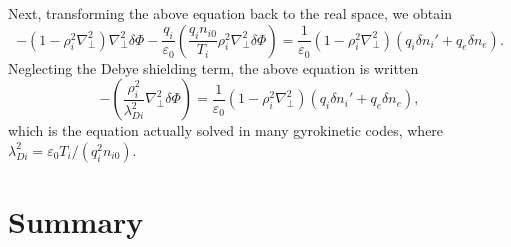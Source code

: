 \documentclass{article}
\begin{document}
Next, transforming the above equation back to the real space, we obtain
\begin{equation}
  - (1 - \rho_i^2 \nabla_{\perp}^2) \nabla_{\perp}^2 \delta \Phi -
  \frac{q_i}{\varepsilon_0} \left( \frac{q_i n_{i 0}}{T_i} \rho_i^2
  \nabla_{\perp}^2 \delta \Phi \right) = \frac{1}{\varepsilon_0} (1 - \rho_i^2
  \nabla_{\perp}^2) (q_i \delta n_i' + q_e \delta n_e) .
\end{equation}
Neglecting the Debye shielding term, the above equation is written
\begin{equation}
  - \left( \frac{\rho_i^2}{\lambda_{D i}^2} \nabla_{\perp}^2 \delta \Phi
  \right) = \frac{1}{\varepsilon_0} (1 - \rho_i^2 \nabla_{\perp}^2) (q_i
  \delta n_i' + q_e \delta n_e),
\end{equation}
which is the equation actually solved in many gyrokinetic codes, where
$\lambda_{D i}^2 = \varepsilon_0 T_i / (q_i^2 n_{i 0})$.

\section{Summary}
\end{document}
